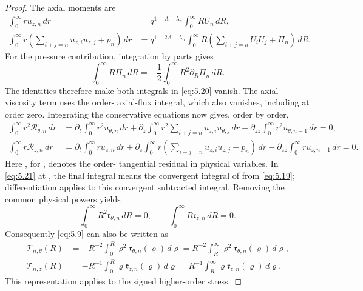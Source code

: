 \begin{proof}
The axial moments are
\begin{equation}\label{eq:5.20}
\begin{aligned}
\int_0^\infty ru_{z,n}\,dr
&=q^{1-A+\lambda_n}\int_0^\infty RU_n\,dR,\\
\int_0^\infty r\left(\sum_{i+j=n}u_{z,i}u_{z,j}+p_n\right)\,dr
&=q^{1-2A+\lambda_n}\int_0^\infty R\left(\sum_{i+j=n}U_iU_j+\Pi_n\right)\,dR.
\end{aligned}
\tag{5.20}
\end{equation}
For the pressure contribution, integration by parts gives
\[
\int_0^\infty R\Pi_n\,dR=-\frac12\int_0^\infty R^2\partial_R\Pi_n\,dR.
\]
The identities  therefore make both integrals in \eqref{eq:5.20} vanish.
The axial-viscosity term uses the order- axial-flux integral, which also vanishes, including at order
zero. Integrating the conservative equations now gives, order by order,
\begin{equation}\label{eq:5.21}
\begin{aligned}
\int_0^\infty r^2\mathscr R_{\theta,n}\,dr
&=\partial_t\int_0^\infty r^2u_{\theta,n}\,dr
 +\partial_z\int_0^\infty r^2\sum_{i+j=n}u_{z,i}u_{\theta,j}\,dr
 -\partial_{zz}\int_0^\infty r^2u_{\theta,n-1}\,dr
 =0,\\
\int_0^\infty r\mathscr R_{z,n}\,dr
&=\partial_t\int_0^\infty ru_{z,n}\,dr
 +\partial_z\int_0^\infty r\left(\sum_{i+j=n}u_{z,i}u_{z,j}+p_n\right)\,dr
 -\partial_{zz}\int_0^\infty ru_{z,n-1}\,dr
 =0.
\end{aligned}
\tag{5.21}
\end{equation}
Here , for
, denotes the order- tangential residual in physical variables. In
\eqref{eq:5.21} at , the final integral means the convergent integral of
 from
%
\eqref{eq:5.19}; differentiation applies to this convergent subtracted integral. Removing the common physical powers yields
\[
\int_0^\infty R^2\mathfrak r_{\theta,n}\,dR=0,
\qquad
\int_0^\infty R\mathfrak r_{z,n}\,dR=0.
\]
Consequently \eqref{eq:5.9} can also be written as
\[
\begin{aligned}
\mathcal T_{n,\theta}(R)
&=-R^{-2}\int_0^R\varrho^2\mathfrak r_{\theta,n}(\varrho)\,d\varrho
 =R^{-2}\int_R^\infty\varrho^2\mathfrak r_{\theta,n}(\varrho)\,d\varrho,\\
\mathcal T_{n,z}(R)
&=-R^{-1}\int_0^R\varrho\mathfrak r_{z,n}(\varrho)\,d\varrho
 =R^{-1}\int_R^\infty\varrho\mathfrak r_{z,n}(\varrho)\,d\varrho.
\end{aligned}
\]
This representation applies to the signed higher-order stress.


\end{proof}
